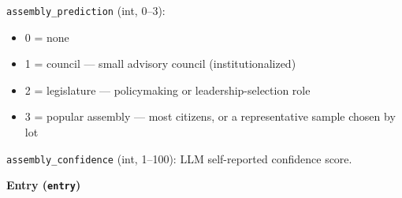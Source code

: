 \documentclass[11pt, a4paper]{article}
\newenvironment{promptquote}{%
  \begin{quote}\small
}{%
  \end{quote}
}
\begin{document}

\texttt{assembly\_prediction} (int, 0--3):
\begin{itemize}[nosep, leftmargin=1.7em]
  \item 0 = none
  \item 1 = council --- small advisory council (institutionalized)
  \item 2 = legislature --- policymaking or leadership-selection role
  \item 3 = popular assembly --- most citizens, or a representative sample chosen by lot
\end{itemize}
\texttt{assembly\_confidence} (int, 1--100): LLM self-reported confidence score.

\bigskip
\textbf{Entry (\texttt{entry})}


\end{document}
